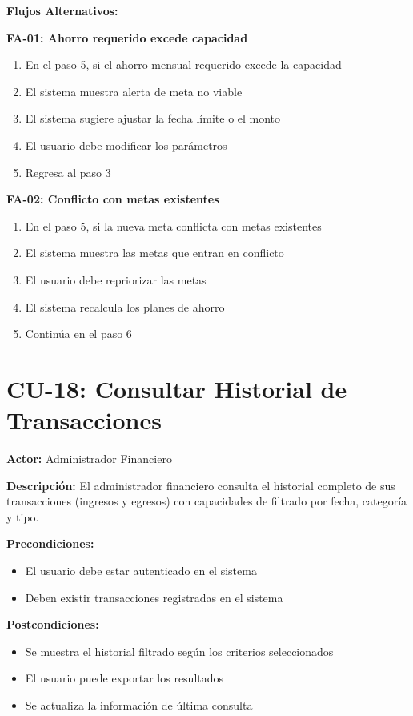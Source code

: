 \noindent\textbf{Flujos Alternativos:}

\textbf{FA-01: Ahorro requerido excede capacidad}
\begin{enumerate}
    \item En el paso 5, si el ahorro mensual requerido excede la capacidad
    \item El sistema muestra alerta de meta no viable
    \item El sistema sugiere ajustar la fecha límite o el monto
    \item El usuario debe modificar los parámetros
    \item Regresa al paso 3
\end{enumerate}

\textbf{FA-02: Conflicto con metas existentes}
\begin{enumerate}
    \item En el paso 5, si la nueva meta conflicta con metas existentes
    \item El sistema muestra las metas que entran en conflicto
    \item El usuario debe repriorizar las metas
    \item El sistema recalcula los planes de ahorro
    \item Continúa en el paso 6
\end{enumerate}

\section{CU-18: Consultar Historial de Transacciones}

\noindent\textbf{Actor:} Administrador Financiero

\noindent\textbf{Descripción:} El administrador financiero consulta el historial completo de sus transacciones (ingresos y egresos) con capacidades de filtrado por fecha, categoría y tipo.

\noindent\textbf{Precondiciones:}
\begin{itemize}
    \item El usuario debe estar autenticado en el sistema
    \item Deben existir transacciones registradas en el sistema
\end{itemize}

\noindent\textbf{Postcondiciones:}
\begin{itemize}
    \item Se muestra el historial filtrado según los criterios seleccionados
    \item El usuario puede exportar los resultados
    \item Se actualiza la información de última consulta
\end{itemize}

